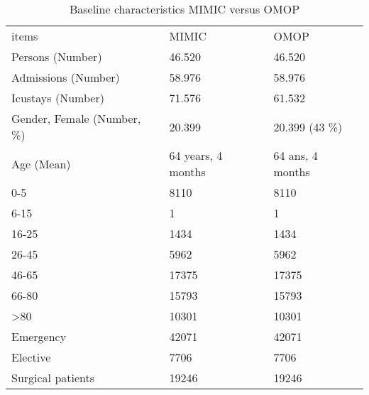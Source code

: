 \begin{table*}[t]
\caption{Baseline characteristics MIMIC versus OMOP}
\begin{tabular}{@{}lll@{}}\toprule
items                                  & MIMIC                       & OMOP                               \\\colrule
Persons (Number)                       & 46.520                      & 46.520                             \\
Admissions (Number)                    & 58.976                      & 58.976                             \\
Icustays (Number)                      & 71.576                      & 61.532                             \\
Gender, Female (Number, \%)            & 20.399                      & 20.399 (43 \%)                     \\
Age (Mean)                             & 64 years, 4 months          & 64 ans, 4 months                   \\
0-5                                    & 8110                        & 8110                               \\
6-15                                   & 1                           & 1                                  \\
16-25                                  & 1434                        & 1434                               \\
26-45                                  & 5962                        & 5962                               \\
46-65                                  & 17375                       & 17375                              \\
66-80                                  & 15793                       & 15793                              \\
\textgreater{}80                       & 10301                       & 10301                              \\
Emergency                              & 42071                       & 42071                              \\
Elective                               & 7706                        & 7706                               \\
Surgical patients                      & 19246                       & 19246                              \\

\end{tabular}
\end{table*}
